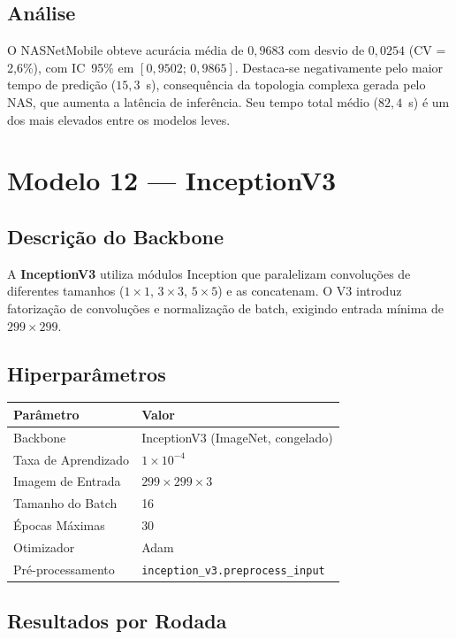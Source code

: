 \documentclass[12pt,a4paper]{article}
\newenvironment{parametros}{%
  \begin{table}[H]
  \centering
  \small
  \begin{tabular}{ll}
  \toprule
  \textbf{Parâmetro} & \textbf{Valor} \\
  \midrule
}{%
  \bottomrule
  \end{tabular}
  \end{table}
}
\begin{document}
\subsection{Análise}

O NASNetMobile obteve acurácia média de $0{,}9683$ com desvio de $0{,}0254$
(CV = 2,6\%), com IC~95\% em $[0{,}9502;\, 0{,}9865]$. Destaca-se negativamente
pelo maior tempo de predição ($15{,}3$~s), consequência da topologia complexa
gerada pelo NAS, que aumenta a latência de inferência. Seu tempo total médio
($82{,}4$~s) é um dos mais elevados entre os modelos leves.

\section{Modelo 12 --- InceptionV3}
\label{sec:inceptionv3}

\subsection{Descrição do Backbone}

A \textbf{InceptionV3} \cite{szegedy2016rethinking} utiliza módulos Inception
que paralelizam convoluções de diferentes tamanhos ($1\times1$, $3\times3$,
$5\times5$) e as concatenam. O V3 introduz fatorização de convoluções e normalização
de batch, exigindo entrada mínima de $299\times299$.

\subsection{Hiperparâmetros}

\begin{parametros}
Backbone              & InceptionV3 (ImageNet, congelado) \\
Taxa de Aprendizado   & $1 \times 10^{-4}$ \\
Imagem de Entrada     & $299 \times 299 \times 3$ \\
Tamanho do Batch      & 16 \\
Épocas Máximas        & 30 \\
Otimizador            & Adam \\
Pré-processamento     & \texttt{inception\_v3.preprocess\_input} \\
\end{parametros}

\subsection{Resultados por Rodada}
\end{document}
